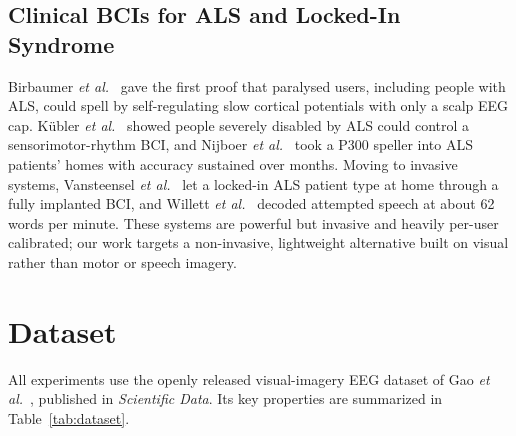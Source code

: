 \documentclass[conference]{IEEEtran}
\begin{document}
\subsection{Clinical BCIs for ALS and Locked-In Syndrome}
Birbaumer \textit{et al.}~\cite{birbaumer1999} gave the first proof that
paralysed users, including people with ALS, could spell by self-regulating
slow cortical potentials with only a scalp EEG cap. K\"ubler
\textit{et al.}~\cite{kubler2005} showed people severely disabled by ALS
could control a sensorimotor-rhythm BCI, and Nijboer
\textit{et al.}~\cite{nijboer2008} took a P300 speller into ALS patients'
homes with accuracy sustained over months. Moving to invasive systems,
Vansteensel \textit{et al.}~\cite{vansteensel2016} let a locked-in ALS
patient type at home through a fully implanted BCI, and Willett
\textit{et al.}~\cite{willett2023} decoded attempted speech at about 62 words
per minute. These systems are powerful but invasive and heavily per-user
calibrated; our work targets a non-invasive, lightweight alternative built on
visual rather than motor or speech imagery.

\section{Dataset}
All experiments use the openly released visual-imagery EEG dataset of
Gao \textit{et al.}~\cite{gao2026}, published in \textit{Scientific Data}.
Its key properties are summarized in Table~\ref{tab:dataset}.
\end{document}
